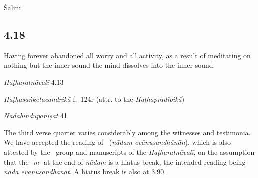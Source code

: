 \begin{ekdosis}
\begin{metre}[hp04_017]
Śālinī 
\end{metre}

\subsection*{4.18}
\begin{translation}[hp04_018]
Having forever abandoned all worry and all activity, as a result of meditating on nothing but the inner sound the mind dissolves into the inner sound.
\end{translation}


\begin{testimonia}[hp04_018]
\emph{Haṭharatnāvalī} 4.13
\begin{versinnote}
\end{versinnote}

\emph{Haṭhasaṅketacandrikā} f.~124r (attr. to the \emph{Haṭhapradīpikā})
\begin{versinnote}
\end{versinnote}

\emph{Nādabindūpaniṣat} 41
\begin{versinnote}
\end{versinnote}
\end{testimonia}

\begin{philcomm}[hp04_018]

The third verse quarter varies considerably among the witnesses and testimonia. We have accepted the reading of \alphaOne\ (\emph{nādam evānusandhānān}), which is also attested by the \textbeta\ group and manuscripts of the \emph{Haṭharatnāvalī}, on the assumption that the -\emph{m}- at the end of \emph{nādam} is a hiatus break, the intended reading being \textit{nāda evānusandhānāt}. A hiatus break is also at 3.90.
\end{philcomm}


\end{ekdosis}
